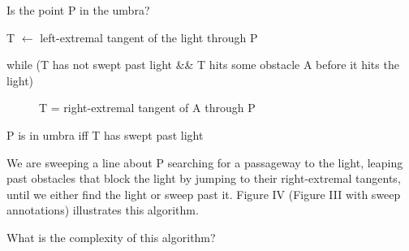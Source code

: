 \documentclass[12pt]{article}
\begin{document}
Is the point P in the umbra?
\begin{description}
\item[] T $\leftarrow$ left-extremal tangent of the light through P
\item[] while (T has not swept past light \&\& 
       T hits some obstacle A before it hits the light)
\begin{description}
\item[]	T = right-extremal tangent of A through P
\end{description}
\item P is in umbra iff T has swept past light
\end{description}

We are sweeping a line about P searching for a passageway to the light, 
leaping past obstacles that block the light by jumping to their right-extremal tangents, 
until we either find the light or sweep past it.
Figure IV (Figure III with sweep annotations) illustrates this algorithm.

What is the complexity of this algorithm?

\end{document}
